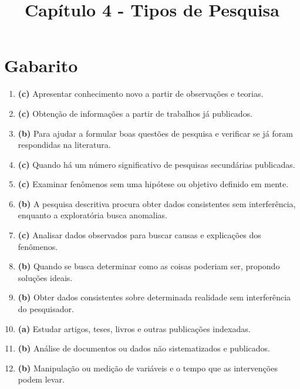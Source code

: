 \documentclass[a4paper,12pt]{article}
\title{Capítulo 4 - Tipos de Pesquisa}
\author{}
\date{}
\begin{document}
\maketitle

\vspace{-3cm}

\section*{Gabarito}

\begin{enumerate}

\item \textbf{(c)} Apresentar conhecimento novo a partir de observações e teorias.

\item \textbf{(c)} Obtenção de informações a partir de trabalhos já publicados.

\item \textbf{(b)} Para ajudar a formular boas questões de pesquisa e verificar se já foram respondidas na literatura.

\item \textbf{(c)} Quando há um número significativo de pesquisas secundárias publicadas.

\item \textbf{(c)} Examinar fenômenos sem uma hipótese ou objetivo definido em mente.

\item \textbf{(b)} A pesquisa descritiva procura obter dados consistentes sem interferência, enquanto a exploratória busca anomalias.

\item \textbf{(c)} Analisar dados observados para buscar causas e explicações dos fenômenos.

\item \textbf{(b)} Quando se busca determinar como as coisas poderiam ser, propondo soluções ideais.

\item \textbf{(b)} Obter dados consistentes sobre determinada realidade sem interferência do pesquisador.

\item \textbf{(a)} Estudar artigos, teses, livros e outras publicações indexadas.

\item \textbf{(b)} Análise de documentos ou dados não sistematizados e publicados.

\item \textbf{(b)} Manipulação ou medição de variáveis e o tempo que as intervenções podem levar.


\end{enumerate}
\end{document}
